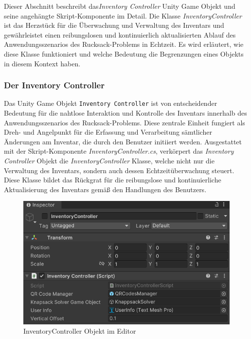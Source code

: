 Dieser Abschnitt beschreibt das\textit{Inventory Controller} Unity Game Objekt und seine angehängte Skript-Komponente im
Detail. Die Klasse \textit{InventoryController} ist das Herzstück für die Überwachung und Verwaltung des Inventars und
gewährleistet einen reibungslosen und kontinuierlich aktualisierten Ablauf des Anwendungsszenarios des Rucksack-Problems
in Echtzeit. Es wird erläutert, wie diese Klasse funktioniert und welche Bedeutung die Begrenzungen eines Objekts in diesem
Kontext haben.

\subsubsection{Der Inventory Controller}
Das Unity Game Objekt \texttt{Inventory Controller} ist von entscheidender Bedeutung für die nahtlose Interaktion und
Kontrolle des Inventars innerhalb des Anwendungsszenarios des Rucksack-Problems. Diese zentrale Einheit fungiert als Dreh-
und Angelpunkt für die Erfassung und Verarbeitung sämtlicher Änderungen am Inventar, die durch den Benutzer initiiert
werden. Ausgestattet mit der Skript-Komponente \textit{InventoryController.cs}, verkörpert das \textit{Inventory Controller}
Objekt die \textit{InventoryController} Klasse, welche nicht nur die Verwaltung des Inventars, sondern auch dessen
Echtzeitüberwachung steuert. Diese Klasse bildet das Rückgrat für die reibungslose und kontinuierliche Aktualisierung des
Inventars gemäß den Handlungen des Benutzers.

\begin{figure}[H]
    \centering
    \includegraphics[scale=0.7]{images/invCon_Editor}
    \caption{InventoryController Objekt im Editor}
    \label{fig:InventoryController_Editor}
\end{figure}

